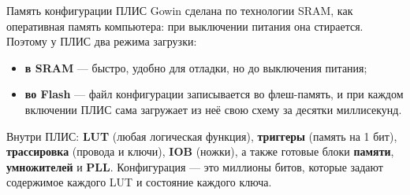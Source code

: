 Память конфигурации ПЛИС Gowin сделана по технологии SRAM, как
оперативная память компьютера: при выключении питания она стирается. Поэтому
у ПЛИС два режима загрузки:
\begin{itemize}
  \item \textbf{в SRAM} --- быстро, удобно для отладки, но до выключения питания;
  \item \textbf{во Flash} --- файл конфигурации записывается во флеш-память,
        и при каждом включении ПЛИС сама загружает из неё свою схему за
        десятки миллисекунд.
\end{itemize}

\begin{ideabox}
Внутри ПЛИС: \textbf{LUT} (любая логическая функция), \textbf{триггеры}
(память на 1 бит), \textbf{трассировка} (провода и ключи), \textbf{IOB}
(ножки), а также готовые блоки \textbf{памяти}, \textbf{умножителей} и
\textbf{PLL}. Конфигурация --- это миллионы битов, которые задают
содержимое каждого LUT и состояние каждого ключа.
\end{ideabox}
